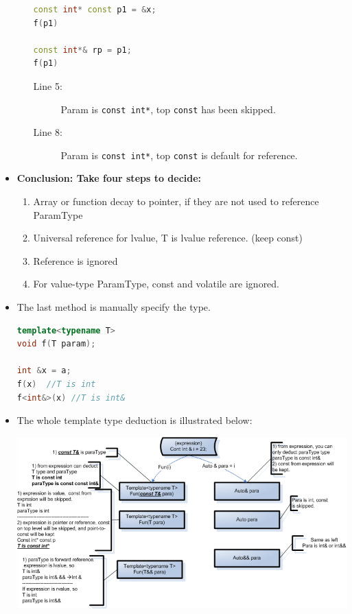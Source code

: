 \documentclass[a4paper,11pt,twoside]{book}
\begin{document}
\begin{itemize}
\begin{enumerate}
\begin{lstlisting}[frame=single, language=c++]
const int* const p1 = &x;
f(p1)  
	
const int*& rp = p1;
f(p1)  
\end{lstlisting}
\begin{description}
	\item[Line 5:] Param is \texttt{const int*}, top \texttt{const} has been skipped. 
	\item[Line 8:] Param is \texttt{const int*}, top \texttt{const} is default for reference. 
\end{description}
	\end{enumerate}
	
	\item \textbf{Conclusion:  Take four steps to decide:}
	\begin{enumerate}
		\item Array or function decay to pointer, if they are not used to reference ParamType
		\item Universal reference for lvalue, T is lvalue reference. (keep const)
		\item Reference is ignored
		\item For value-type ParamType, const and volatile are ignored.
	\end{enumerate}
	
	\item The last method is manually specify the type.  
\begin{lstlisting}[frame=single, language=c++]
template<typename T>
void f(T param); 
	
int &x = a;
f(x)  //T is int
f<int&>(x) //T is int&
\end{lstlisting}
	


\item The whole template type deduction is illustrated below:
\begin{center}
	\includegraphics[scale=0.7]{pics/type_deduct.png}
\end{center}

\end{itemize}
\end{document}
